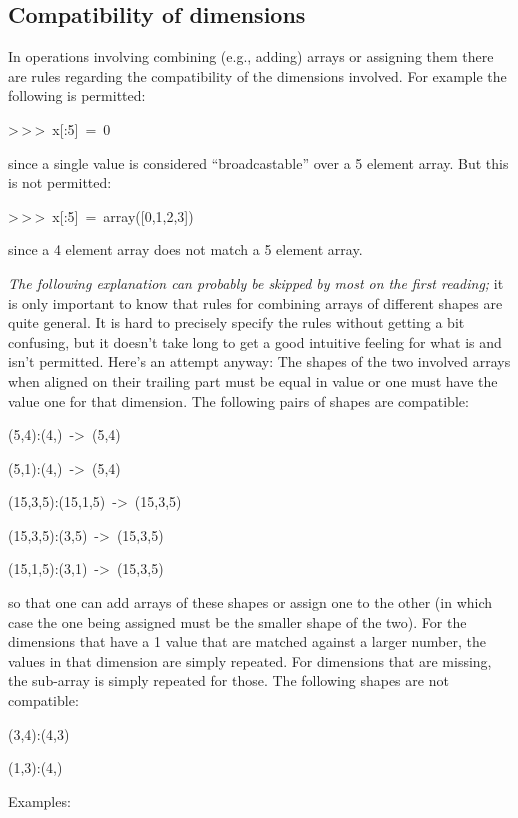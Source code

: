 \subsection{Compatibility of dimensions}

In operations involving combining (e.g., adding) arrays or assigning
them there are rules regarding the compatibility of the dimensions
involved. For example the following is permitted:

\begin{lyxcode}
>\,{}>\,{}>~x{[}:5]~=~0
\end{lyxcode}
since a single value is considered {}``broadcastable'' over a 5
element array. But this is not permitted:

\begin{lyxcode}
>\,{}>\,{}>~x{[}:5]~=~array({[}0,1,2,3])~
\end{lyxcode}
since a 4 element array does not match a 5 element array. 

\emph{The following explanation can probably be skipped by most on
the first reading;} it is only important to know that rules for combining
arrays of different shapes are quite general. It is hard to precisely
specify the rules without getting a bit confusing, but it doesn't
take long to get a good intuitive feeling for what is and isn't permitted.
Here's an attempt anyway: The shapes of the two involved arrays when
aligned on their trailing part must be equal in value or one must
have the value one for that dimension. The following pairs of shapes
are compatible:

\begin{lyxcode}
(5,4):(4,)~->~(5,4)

(5,1):(4,)~->~(5,4)

(15,3,5):(15,1,5)~->~(15,3,5)

(15,3,5):(3,5)~->~(15,3,5)

(15,1,5):(3,1)~->~(15,3,5)
\end{lyxcode}
so that one can add arrays of these shapes or assign one to the other
(in which case the one being assigned must be the smaller shape of
the two). For the dimensions that have a 1 value that are matched
against a larger number, the values in that dimension are simply repeated.
For dimensions that are missing, the sub-array is simply repeated
for those. The following shapes are not compatible:

\begin{lyxcode}
(3,4):(4,3)

(1,3):(4,)
\end{lyxcode}
Examples:

